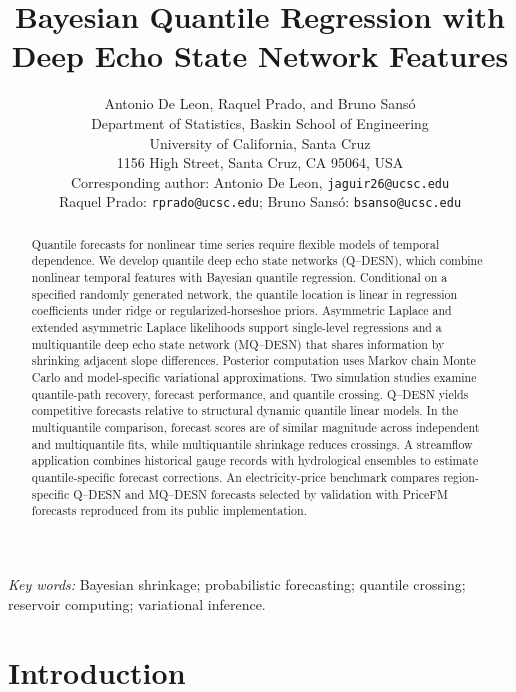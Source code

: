 \documentclass[12pt,letterpaper]{article}
\title{Bayesian Quantile Regression with\\Deep Echo State Network Features}
\author{}
\author{Antonio De Leon, Raquel Prado, and Bruno Sans\'o\\
Department of Statistics, Baskin School of Engineering\\
University of California, Santa Cruz\\
1156 High Street, Santa Cruz, CA 95064, USA\\[0.5em]
Corresponding author: Antonio De Leon, \texttt{jaguir26@ucsc.edu}\\
Raquel Prado: \texttt{rprado@ucsc.edu}; Bruno Sans\'o: \texttt{bsanso@ucsc.edu}}
\date{}
\makeatletter
\newif\ifQdesnAnonymous
\numberwithin{equation}{section}
\renewcommand{\maketitle}{%
  \ifQdesnAnonymous
    \begin{center}\bfseries\@title\end{center}%
  \else
    \hypersetup{pageanchor=false}%
    \begin{titlepage}
    \begin{center}\bfseries\@title\par\medskip\normalfont\@author\par\end{center}
    \end{titlepage}%
    \hypersetup{pageanchor=true}%
  \fi
}
\makeatother
\begin{document}
\maketitle

\begin{abstract}
\normalsize
\noindent
Quantile forecasts for nonlinear time series require flexible models of temporal
dependence. We develop quantile deep echo state networks (Q--DESN), which
combine nonlinear temporal features with Bayesian quantile regression.
Conditional on a specified randomly generated network, the quantile location
is linear in regression coefficients under ridge or regularized-horseshoe
priors. Asymmetric Laplace and extended asymmetric Laplace likelihoods support
single-level regressions and a multiquantile deep echo state network
(MQ--DESN) that shares information by shrinking adjacent slope differences.
Posterior computation
uses Markov chain Monte Carlo and model-specific variational approximations.
Two simulation studies examine quantile-path recovery, forecast performance,
and quantile crossing. Q--DESN yields competitive forecasts relative to
structural dynamic quantile linear models. In the multiquantile comparison,
forecast scores are of similar magnitude across independent and multiquantile
fits, while multiquantile shrinkage reduces crossings. A streamflow application
combines historical gauge records with hydrological ensembles to estimate
quantile-specific forecast corrections. An electricity-price benchmark compares
region-specific Q--DESN and MQ--DESN forecasts selected by validation with
PriceFM forecasts reproduced from its public implementation.
\end{abstract}

\noindent\textit{Key words:} Bayesian shrinkage; probabilistic forecasting;
quantile crossing; reservoir computing; variational inference.

\bigskip

\section{Introduction}
\label{sec:intro}
\end{document}
